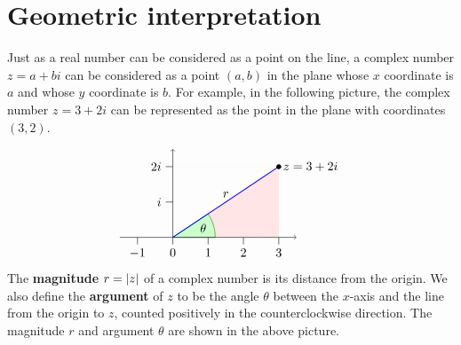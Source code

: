 \section{Geometric interpretation}

Just as a real number can be considered as a point on the line, a
complex number $z = a + bi$ can be considered as a point $(a,b)$ in
the plane whose $x$ coordinate is $a$ and whose $y$ coordinate is
$b$. For example, in the following picture, the complex number
$z = 3+2i$ can be represented as the point in the plane with
coordinates $(3,2)$.

\begin{equation*}
  \begin{tikzpicture}
    \draw[help lines, dotted, fill=red!10] (0,0) -- (3,0) -- (3,2) -- cycle;
    \draw[help lines, dotted] (0,2) -- (3,2);
    \filldraw[fill=green!20,draw=green!50!black] (0,0) -- (1.2,0) arc (0:33.69:1.2) -- cycle;
    \node at (16.845:9mm){$\theta$};
    \draw[->](-1.5,0) -- (3.5,0);
    \draw[->](0,0) -- (0,2.5);
    \draw(0,1) -- +(-0.2,0) node[left] {$i$};
    \draw(0,2) -- +(-0.2,0) node[left] {$2i$};
    \draw(-1,0) -- +(0,-0.2) node[below] {$-1$};
    \draw(0,0) -- +(0,-0.2) node[below] {$0$};
    \draw(1,0) -- +(0,-0.2) node[below] {$1$};
    \draw(2,0) -- +(0,-0.2) node[below] {$2$};
    \draw(3,0) -- +(0,-0.2) node[below] {$3$};
    \draw[thick, blue] (0,0) -- node[above, black] {$r$} (3,2);
    \draw[fill, black] (3,2) circle [radius=1.8pt] node [right] {$z = 3+2i$};
  \end{tikzpicture}
\end{equation*}
The \textbf{magnitude}%
%
 $r=\left|z\right|$ of a complex number
is its distance from the origin. We also define the \textbf{argument}
of $z$ to be the angle $\theta$ between the $x$-axis and the line from
the origin to $z$, counted positively in the counterclockwise
direction. The magnitude $r$ and argument $\theta$ are shown in the
above picture.

